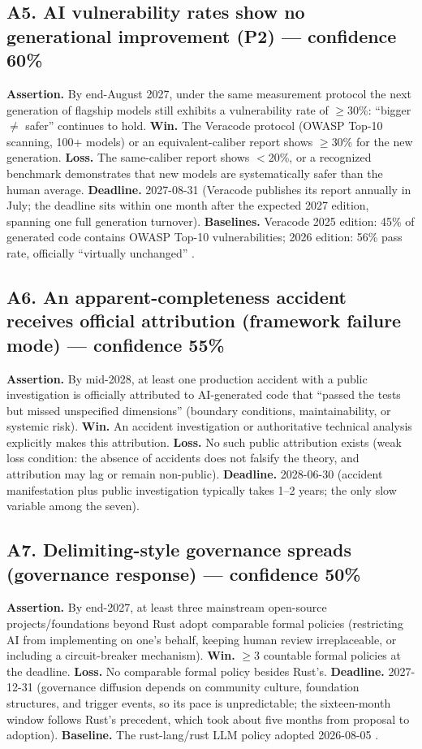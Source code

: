 \documentclass[11pt]{article}
\begin{document}
\subsection*{A5. AI vulnerability rates show no generational improvement
(P2) --- confidence 60\%}
\textbf{Assertion.} By end-August 2027, under the same measurement protocol the
next generation of flagship models still exhibits a vulnerability rate of
$\geq$30\%: ``bigger $\neq$ safer'' continues to hold. \textbf{Win.} The
Veracode protocol (OWASP Top-10 scanning, 100+ models) or an
equivalent-caliber report shows $\geq$30\% for the new generation.
\textbf{Loss.} The same-caliber report shows $<$20\%, or a recognized
benchmark demonstrates that new models are systematically safer than the
human average. \textbf{Deadline.} 2027-08-31 (Veracode publishes its
report annually in July; the deadline sits within one month after the
expected 2027 edition, spanning one full generation turnover).
\textbf{Baselines.} Veracode 2025 edition: 45\% of generated code contains
OWASP Top-10 vulnerabilities; 2026 edition: 56\% pass rate, officially
``virtually unchanged'' \cite{veracode}.

\subsection*{A6. An apparent-completeness accident receives official
attribution (framework failure mode) --- confidence 55\%}
\textbf{Assertion.} By mid-2028, at least one production accident with a
public investigation is officially attributed to AI-generated code that
``passed the tests but missed unspecified dimensions'' (boundary
conditions, maintainability, or systemic risk). \textbf{Win.} An accident
investigation or authoritative technical analysis explicitly makes this
attribution. \textbf{Loss.} No such public attribution exists (weak loss
condition: the absence of accidents does not falsify the theory, and
attribution may lag or remain non-public). \textbf{Deadline.} 2028-06-30
(accident manifestation plus public investigation typically takes 1--2
years; the only slow variable among the seven).

\subsection*{A7. Delimiting-style governance spreads (governance response)
--- confidence 50\%}
\textbf{Assertion.} By end-2027, at least three mainstream open-source
projects/foundations beyond Rust adopt comparable formal policies
(restricting AI from implementing on one's behalf, keeping human review
irreplaceable, or including a circuit-breaker mechanism). \textbf{Win.}
$\geq$3 countable formal policies at the deadline. \textbf{Loss.} No
comparable formal policy besides Rust's. \textbf{Deadline.} 2027-12-31
(governance diffusion depends on community culture, foundation
structures, and trigger events, so its pace is unpredictable; the
sixteen-month window follows Rust's precedent, which took about five
months from proposal to adoption).
\textbf{Baseline.} The rust-lang/rust LLM policy adopted 2026-08-05
\cite{rustblog,rustpolicy}.
\end{document}
